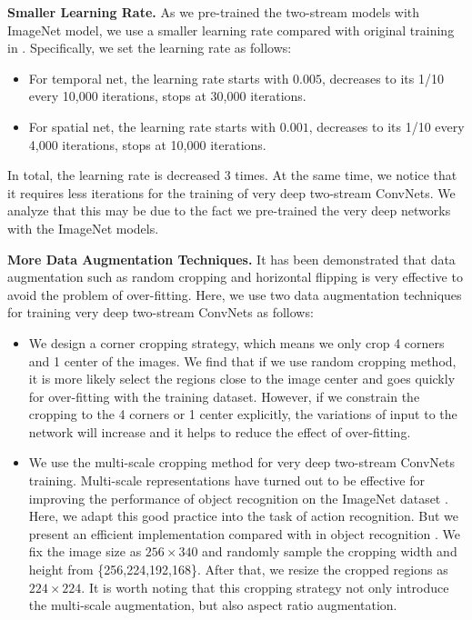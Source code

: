 \documentclass[10pt,twocolumn,letterpaper]{article}
\begin{document}
\textbf{Smaller Learning Rate.} As we pre-trained the two-stream models with ImageNet model, we use a smaller learning rate compared with original training in \cite{SimonyanZ14}. Specifically, we set the learning rate as follows:
\begin{itemize}
  \item For temporal net, the learning rate starts with $0.005$, decreases to its 1/10 every 10,000 iterations, stops at 30,000 iterations.
  \item For spatial net, the learning rate starts with $0.001$, decreases to its 1/10 every 4,000 iterations, stops at 10,000 iterations.
\end{itemize}
In total, the learning rate is decreased 3 times. At the same time, we notice that it requires less iterations for the training of very deep two-stream ConvNets. We analyze that this may be due to the fact we pre-trained the very deep networks with the ImageNet models.

\textbf{More Data Augmentation Techniques.} It has been demonstrated that data augmentation such as random cropping and horizontal flipping is very effective to avoid the problem of over-fitting. Here, we use two data augmentation techniques for training very deep two-stream ConvNets as follows:
\begin{itemize}
  \item We design a corner cropping strategy, which means we only crop 4 corners and 1 center of the images. We find that if we use random cropping method, it is more likely select the regions close to the image center and goes quickly for over-fitting with the training dataset. However, if we constrain the cropping to the 4 corners or 1 center explicitly, the variations of input to the network will increase and it helps to reduce the effect of over-fitting.
  \item We use the multi-scale cropping method for very deep two-stream ConvNets training. Multi-scale representations have turned out to be effective for improving the performance of object recognition on the ImageNet dataset \cite{SimonyanZ14a}. Here, we adapt this good practice into the task of action recognition. But we present an efficient implementation compared with in object recognition \cite{SimonyanZ14a}. We fix the image size as $256 \times 340$ and randomly sample the cropping width and height from \{256,224,192,168\}. After that, we resize the cropped regions as $224 \times 224$. It is worth noting that this cropping strategy not only introduce the multi-scale augmentation, but also aspect ratio augmentation.
\end{itemize}
\end{document}
